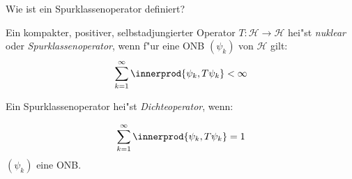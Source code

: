 \documentclass[9pt]{article}
\DeclarePairedDelimiter{\innerprod}\langle\rangle
\newcommand{\Hi}{\mathcal{H}}
\newenvironment{field}{}{\newpage}
\newif\ifnote
\newenvironment{note}{\notetrue}{\notefalse}
\newcommand{\localtag}{}
\newcommand{\globaltag}{}
\newcommand{\uuid}{}
\newcommand{\tags}[1]{
    \ifnote 
        \renewcommand{\localtag}{#1}
    \else
        \renewcommand{\globaltag}{#1}
    \fi 
    }
\newcommand{\xplain}[1]{\renewcommand{\uuid}{#1}}
\begin{document}
\begin{note}
	\xplain{4f7ece72-2a59-4131-b755-2e54e0310ecb}
	\tags{7.3.1}
	
	\begin{field}  %
		Wie ist ein Spurklassenoperator definiert?
	\end{field}
	
	\begin{field}  %
		Ein kompakter, positiver, selbstadjungierter Operator $T: \Hi \rightarrow \Hi$ hei"st \textit{nuklear} oder \textit{Spurklassenoperator}, wenn f"ur eine ONB $(\psi_k)$ von $\Hi$ gilt:
		\begin{equation*}
			\sum _{k=1}^\infty \innerprod{\psi_k, T\psi_k} < \infty
		\end{equation*}
	\end{field}
		
	\begin{field}  %
		Ein Spurklassenoperator hei"st \textit{ Dichteoperator}, wenn:
	\end{field}
	
	\begin{field}  %
		\begin{equation*}
			\sum_{k=1}^\infty \innerprod{\psi_k, T\psi_k} = 1
		\end{equation*}
		$(\psi_k)$ eine ONB.
	\end{field}
\end{note}
\end{document}
